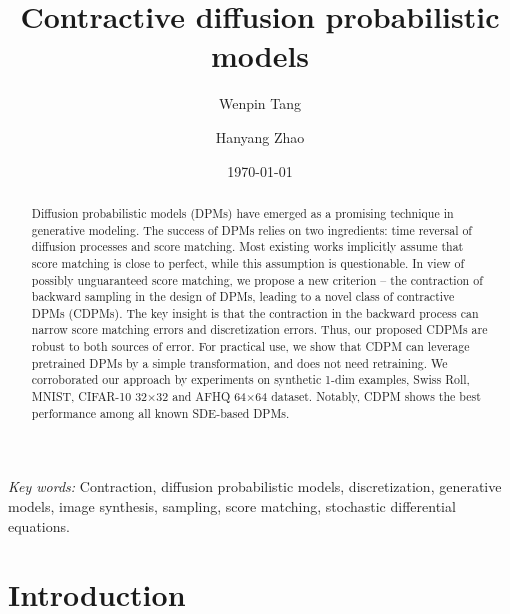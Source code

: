 \documentclass[letterpaper,11pt,reqno]{amsart}
\numberwithin{equation}{section}
\begin{document}
\title[Contractive diffusion models]{Contractive diffusion probabilistic models}

\author[Wenpin Tang]{{Wenpin} Tang}
\address{Department of Industrial Engineering and Operations Research, Columbia University. 
} 

\author[Hanyang Zhao]{{Hanyang} Zhao}
\address{Department of Industrial Engineering and Operations Research, Columbia University. 
} 

\date{\today} 
\begin{abstract}
Diffusion probabilistic models (DPMs) have emerged as a promising technique in generative modeling. The success of DPMs relies on two ingredients: time reversal of diffusion processes and score matching. Most existing works implicitly assume that score matching is close to perfect,
while this assumption is questionable. In view of possibly unguaranteed score matching, we propose a new criterion -- the contraction of backward sampling in the design of DPMs, leading to a novel class of contractive DPMs (CDPMs). 
The key insight is that the contraction in the backward process can narrow score matching errors and discretization errors.
Thus, our proposed CDPMs are robust to both sources of error. 
For practical use, we show that CDPM can leverage pretrained DPMs by a simple transformation, and does not need retraining. 
We corroborated our approach by experiments on synthetic 1-dim examples, 
Swiss Roll, MNIST, CIFAR-10 32$\times$32 and AFHQ 64$\times$64 dataset. 
Notably, CDPM shows the best performance among all known SDE-based DPMs.
\end{abstract}

\maketitle
\textit{Key words:} Contraction, diffusion probabilistic models, discretization, generative models, image synthesis, sampling, score matching, stochastic differential equations.

\section{Introduction}
\label{sc1}
\end{document}
